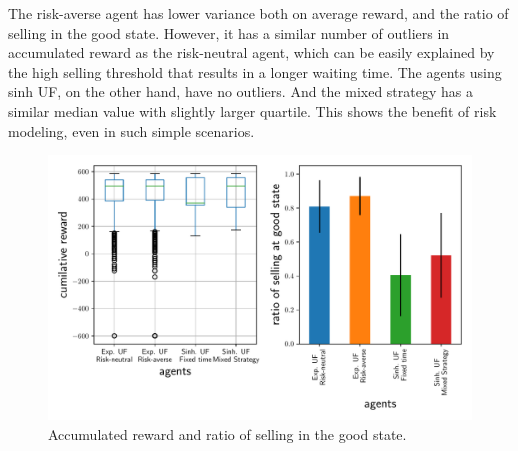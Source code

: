 The risk-averse agent has lower variance both on average reward, and the ratio of selling in the good state. However, it has a similar number of outliers in accumulated reward as the risk-neutral agent, which can be easily explained by the high selling threshold that results in a longer waiting time. The agents using sinh UF, on the other hand, have no outliers. And the mixed strategy has a similar median value with slightly larger quartile.
This shows the benefit of risk modeling, even in such simple scenarios.

\begin{figure}[h]
    \centering
    \includegraphics[width=0.99\linewidth]{img/performance.pdf}
    \caption{Accumulated reward and ratio of selling in the good state.}\label{fig:perf}
\end{figure}
